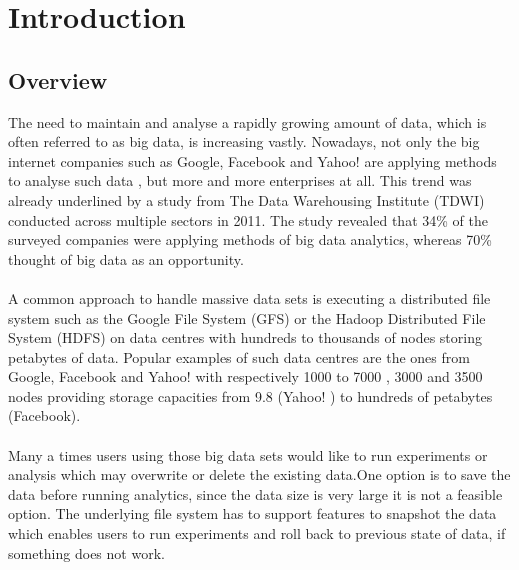 
%
%
%


\chapter{Introduction}
\label{ch:Introduction}

\section{Overview}
The need to maintain and analyse a rapidly growing amount of data, which is often referred to as big data, is increasing vastly. Nowadays, not only the big internet companies such as Google, Facebook and Yahoo! are applying methods to analyse such data , but more and more enterprises at all. This trend was already underlined by a study from The Data Warehousing Institute (TDWI)  conducted across multiple sectors in 2011. The study \cite{TWDI-Report} revealed that 34\% of the surveyed companies were applying methods of big data analytics, whereas 70\% thought of big data as an opportunity. \\\\
  A common approach to handle massive data sets is executing a distributed file system such as the Google File System (GFS)  or the Hadoop Distributed File System (HDFS)  on data centres with hundreds to thousands of nodes storing petabytes of data. Popular examples of such data centres are the ones from Google, Facebook and Yahoo! with respectively 1000 to 7000 , 3000  and 3500 nodes  providing storage capacities from 9.8 (Yahoo! ) to hundreds of petabytes (Facebook).\\\\
Many a times users using those big data sets would like to run experiments or analysis which may overwrite or delete the existing data.One option is to save the data before running analytics, since the data size is very large it is not a feasible option. The underlying file system has to support features to snapshot the data which enables users to run experiments and roll back to previous state of data, if something does not work.\\\\
